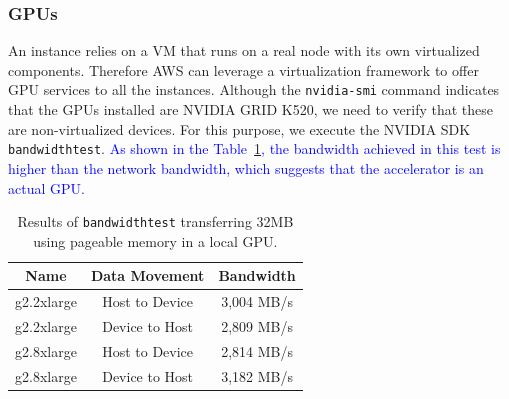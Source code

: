 \documentclass[a4paper,twoside]{article}
\begin{document}
\subsubsection{GPUs}
An instance relies on a VM that runs on a real node with its own virtualized components. 
Therefore AWS can leverage a virtualization framework to offer GPU services to all the instances.
Although the {\tt nvidia-smi} command indicates that the GPUs installed are NVIDIA GRID K520, 
we need to verify that these are non-virtualized devices. For this purpose, we execute the NVIDIA SDK {\tt bandwidthtest}. 
\textcolor{blue}{As shown in the Table~\ref{table:bwt}, the bandwidth achieved in this test is higher than the network bandwidth, which suggests that the accelerator is an actual GPU. }

\begin{table}[htb]
\renewcommand{\arraystretch}{1.3}
\caption{Results of {\tt bandwidthtest} transferring 32MB using pageable memory in a local GPU.}
\label{table:bwt}
\tabcolsep=0.09cm
\begin{center}\begin{tabular}{ccc}
Name &  Data Movement & Bandwidth \\ \hline \hline
g2.2xlarge & Host to Device & 3,004 MB/s \\ \hline
g2.2xlarge & Device to Host & 2,809 MB/s\\ \hline
g2.8xlarge & Host to Device & 2,814 MB/s\\ \hline
g2.8xlarge & Device to Host & 3,182 MB/s\\ \hline
\end{tabular}\end{center}\end{table}
\end{document}
